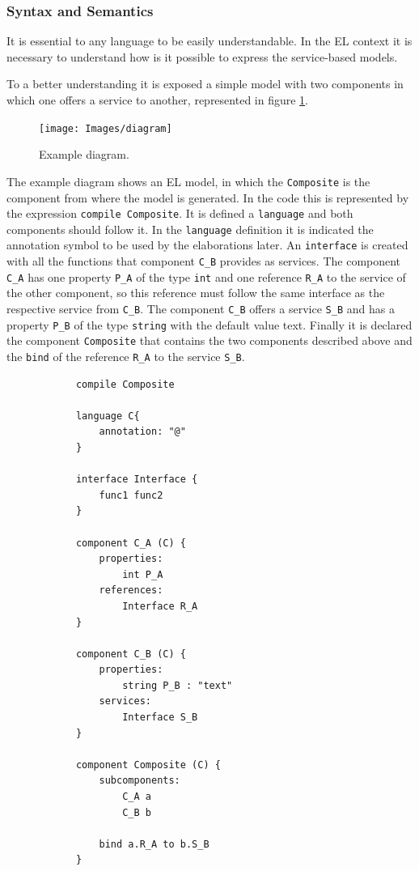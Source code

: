 \documentclass{report}
\begin{document}
			\subsubsection{Syntax and Semantics}
			
			\par It is essential to any language to be easily understandable. In the EL context it is necessary to understand how is it possible to express the service-based models.
			\par To a better understanding it is exposed a simple model with two components in which one offers a service to another, represented in figure \ref{fig:example-diagram}.
			
			\begin{figure} [!h]
				\centering
				\texttt{[image: Images/diagram]}
				\caption{Example diagram.}
				\label{fig:example-diagram}
			\end{figure}
			
			\par The example diagram shows an EL model, in which the \texttt{Composite} is the component from where the model is generated. In the code this is represented by the expression \texttt{compile Composite}. It is defined a \texttt{language} and both components should follow it. In the \texttt{language} definition it is indicated the annotation symbol to be used by the elaborations later. An \texttt{interface} is created with all the functions that component \texttt{C\_B} provides as services. The component \texttt{C\_A} has one property \texttt{P\_A} of the type \texttt{int} and one reference \texttt{R\_A} to the service of the other component, so this reference must follow the same interface as the respective service from \texttt{C\_B}. The component \texttt{C\_B} offers a service \texttt{S\_B} and has a property \texttt{P\_B} of the type \texttt{string} with the default value text. Finally it is declared the component \texttt{Composite} that contains the two components described above and the \texttt{bind} of the reference \texttt{R\_A} to the service \texttt{S\_B}.
			
			\begin{lstlisting}
			compile Composite
			
			language C{
				annotation: "@"
			}
			
			interface Interface {
				func1 func2
			}
			
			component C_A (C) {
				properties:
					int P_A
				references:
					Interface R_A
			}
			
			component C_B (C) {
				properties:
					string P_B : "text"
				services:
					Interface S_B
			}
			
			component Composite (C) {
				subcomponents:
					C_A a
					C_B b
				
				bind a.R_A to b.S_B
			}
			\end{lstlisting} 
\end{document}
